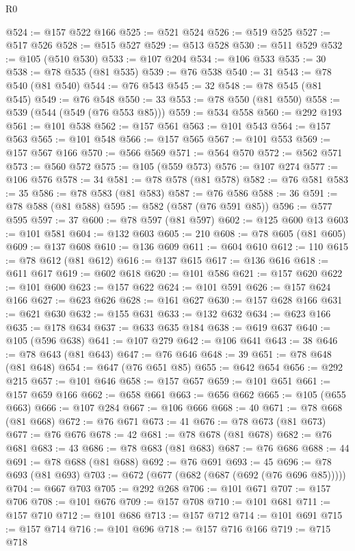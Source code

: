\begin{lexlean}{R0}
\begin{coremodule}
@524 := @157 @522 @166
@525 := @521 @524
@526 := @519 @525
@527 := @517 @526
@528 := @515 @527
@529 := @513 @528
@530 := @511 @529
@532 := @105 (@510 @530)
@533 := @107 @204
@534 := @106 @533
@535 := 30
@538 := @78 @535 (@81 @535)
@539 := @76 @538
@540 := 31
@543 := @78 @540 (@81 @540)
@544 := @76 @543
@545 := 32
@548 := @78 @545 (@81 @545)
@549 := @76 @548
@550 := 33
@553 := @78 @550 (@81 @550)
@558 := @539 (@544 (@549 (@76 @553 @85)))
@559 := @534 @558
@560 := @292 @193
@561 := @101 @538
@562 := @157 @561
@563 := @101 @543
@564 := @157 @563
@565 := @101 @548
@566 := @157 @565
@567 := @101 @553
@569 := @157 @567 @166
@570 := @566 @569
@571 := @564 @570
@572 := @562 @571
@573 := @560 @572
@575 := @105 (@559 @573)
@576 := @107 @274
@577 := @106 @576
@578 := 34
@581 := @78 @578 (@81 @578)
@582 := @76 @581
@583 := 35
@586 := @78 @583 (@81 @583)
@587 := @76 @586
@588 := 36
@591 := @78 @588 (@81 @588)
@595 := @582 (@587 (@76 @591 @85))
@596 := @577 @595
@597 := 37
@600 := @78 @597 (@81 @597)
@602 := @125 @600 @13
@603 := @101 @581
@604 := @132 @603
@605 := 210
@608 := @78 @605 (@81 @605)
@609 := @137 @608
@610 := @136 @609
@611 := @604 @610
@612 := 110
@615 := @78 @612 (@81 @612)
@616 := @137 @615
@617 := @136 @616
@618 := @611 @617
@619 := @602 @618
@620 := @101 @586
@621 := @157 @620
@622 := @101 @600
@623 := @157 @622
@624 := @101 @591
@626 := @157 @624 @166
@627 := @623 @626
@628 := @161 @627
@630 := @157 @628 @166
@631 := @621 @630
@632 := @155 @631
@633 := @132 @632
@634 := @623 @166
@635 := @178 @634
@637 := @633 @635 @184
@638 := @619 @637
@640 := @105 (@596 @638)
@641 := @107 @279
@642 := @106 @641
@643 := 38
@646 := @78 @643 (@81 @643)
@647 := @76 @646
@648 := 39
@651 := @78 @648 (@81 @648)
@654 := @647 (@76 @651 @85)
@655 := @642 @654
@656 := @292 @215
@657 := @101 @646
@658 := @157 @657
@659 := @101 @651
@661 := @157 @659 @166
@662 := @658 @661
@663 := @656 @662
@665 := @105 (@655 @663)
@666 := @107 @284
@667 := @106 @666
@668 := 40
@671 := @78 @668 (@81 @668)
@672 := @76 @671
@673 := 41
@676 := @78 @673 (@81 @673)
@677 := @76 @676
@678 := 42
@681 := @78 @678 (@81 @678)
@682 := @76 @681
@683 := 43
@686 := @78 @683 (@81 @683)
@687 := @76 @686
@688 := 44
@691 := @78 @688 (@81 @688)
@692 := @76 @691
@693 := 45
@696 := @78 @693 (@81 @693)
@703 := @672 (@677 (@682 (@687 (@692 (@76 @696 @85)))))
@704 := @667 @703
@705 := @292 @268
@706 := @101 @671
@707 := @157 @706
@708 := @101 @676
@709 := @157 @708
@710 := @101 @681
@711 := @157 @710
@712 := @101 @686
@713 := @157 @712
@714 := @101 @691
@715 := @157 @714
@716 := @101 @696
@718 := @157 @716 @166
@719 := @715 @718

\end{coremodule}
\end{lexlean}
